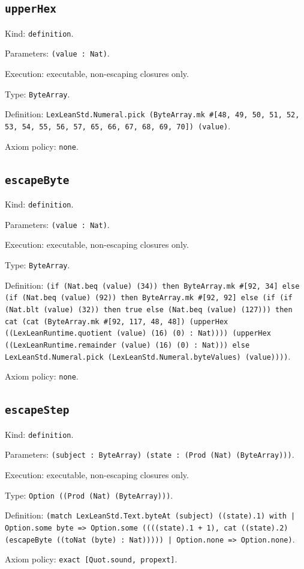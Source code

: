\documentclass[11pt]{article}
\begin{document}
\subsection*{\texttt{upperHex}}
\noindent Kind: \texttt{definition}.\par
\noindent Parameters: \texttt{(value : Nat)}.\par
\noindent Execution: executable, non-escaping closures only.\par
\noindent Type: \texttt{ByteArray}.\par
\noindent Definition: \texttt{LexLeanStd.Numeral.pick (ByteArray.mk \#[48, 49, 50, 51, 52, 53, 54, 55, 56, 57, 65, 66, 67, 68, 69, 70]) (value)}.\par
\noindent Axiom policy: \texttt{none}.\par
\subsection*{\texttt{escapeByte}}
\noindent Kind: \texttt{definition}.\par
\noindent Parameters: \texttt{(value : Nat)}.\par
\noindent Execution: executable, non-escaping closures only.\par
\noindent Type: \texttt{ByteArray}.\par
\noindent Definition: \texttt{(if (Nat.beq (value) (34)) then ByteArray.mk \#[92, 34] else (if (Nat.beq (value) (92)) then ByteArray.mk \#[92, 92] else (if (if (Nat.blt (value) (32)) then true else (Nat.beq (value) (127))) then cat (cat (ByteArray.mk \#[92, 117, 48, 48]) (upperHex ((LexLeanRuntime.quotient (value) (16) (0) : Nat)))) (upperHex ((LexLeanRuntime.remainder (value) (16) (0) : Nat))) else LexLeanStd.Numeral.pick (LexLeanStd.Numeral.byteValues) (value))))}.\par
\noindent Axiom policy: \texttt{none}.\par
\subsection*{\texttt{escapeStep}}
\noindent Kind: \texttt{definition}.\par
\noindent Parameters: \texttt{(subject : ByteArray) (state : (Prod (Nat) (ByteArray)))}.\par
\noindent Execution: executable, non-escaping closures only.\par
\noindent Type: \texttt{Option ((Prod (Nat) (ByteArray)))}.\par
\noindent Definition: \texttt{(match LexLeanStd.Text.byteAt (subject) ((state).1) with | Option.some byte => Option.some ((((state).1 + 1), cat ((state).2) (escapeByte ((toNat (byte) : Nat))))) | Option.none => Option.none)}.\par
\noindent Axiom policy: \texttt{exact [Quot.sound, propext]}.\par
\end{document}
